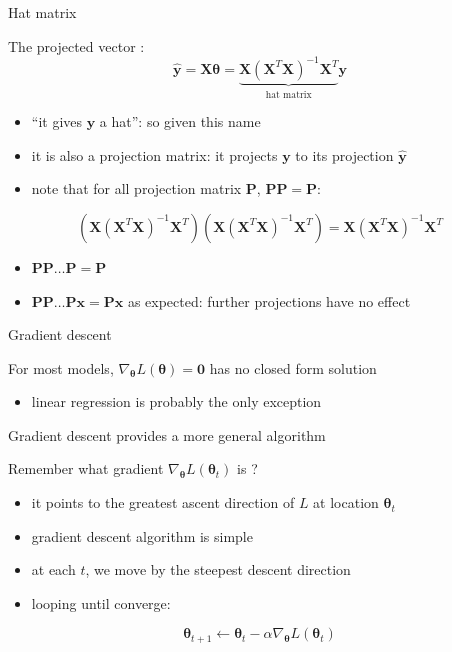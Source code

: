 \documentclass[ignorenonframetext,]{beamer}
\providecommand{\tightlist}{%
  \setlength{\itemsep}{0pt}\setlength{\parskip}{0pt}}
\newcommand{\vv}[1]{\boldsymbol{#1}}
\begin{document}
\begin{frame}{Hat matrix}
\protect\hypertarget{hat-matrix}{}

The projected vector :
\[\hat{\vv{y}} = \vv{X}\vv{\theta} = \underbrace{\vv{X} (\vv{X}^{T}\vv{X})^{-1}\vv{X}^{T}}_{\text{hat matrix}}\vv{y}\]

\begin{itemize}
\tightlist
\item
  ``it gives \(\vv{y}\) a hat'': so given this name
\item
  it is also a projection matrix: it projects \(\vv{y}\) to its
  projection \(\hat{\vv{y}}\)
\item
  note that for all projection matrix \(\vv{P}\), \(\vv{PP} =\vv{P}\):
\end{itemize}

\[(\vv{X} (\vv{X}^{T}\vv{X})^{-1}\vv{X}^{T})(\vv{X} (\vv{X}^{T}\vv{X})^{-1}\vv{X}^{T}) =\vv{X} (\vv{X}^{T}\vv{X})^{-1}\vv{X}^{T}\]

\begin{itemize}
\tightlist
\item
  \(\vv{PP}\ldots\vv{P} =\vv{P}\)
\item
  \(\vv{PP}\ldots\vv{Px} = \vv{Px}\) as expected: further projections
  have no effect
\end{itemize}

\end{frame}

\begin{frame}{Gradient descent}
\protect\hypertarget{gradient-descent}{}

For most models, \(\nabla_{\vv{\theta}} L(\vv{\theta}) = \vv{0}\) has no
closed form solution

\begin{itemize}
\tightlist
\item
  linear regression is probably the only exception
\end{itemize}

\bigskip

Gradient descent provides a more general algorithm

\bigskip

Remember what gradient \(\nabla_{\vv{\theta}} L(\vv{\theta}_t)\) is ?

\begin{itemize}
\tightlist
\item
  it points to the greatest ascent direction of \(L\) at location
  \(\vv{\theta}_t\)
\item
  gradient descent algorithm is simple
\item
  at each \(t\), we move by the steepest descent direction
\item
  looping until converge:
\end{itemize}

\[\vv{\theta}_{t+1} \leftarrow  \vv{\theta}_{t} - \alpha \nabla_{\vv{\theta}}L(\vv{\theta}_t)\]

\end{frame}
\end{document}
